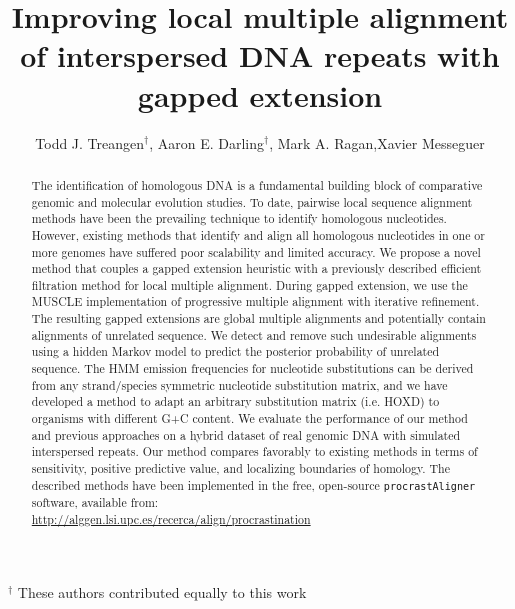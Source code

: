 \documentclass{llncs}
\begin{document}
\title{Improving local multiple alignment of interspersed DNA repeats with gapped extension}

\author{Todd J. Treangen$^\dag$, Aaron E. Darling$^\dag$, Mark A. Ragan,Xavier Messeguer}
%
%

\maketitle
{\center \scriptsize $^\dag$ These authors contributed equally to this work \\}

\begin{abstract}
The identification of homologous DNA is a fundamental building block
of comparative genomic and molecular evolution studies. To date,
pairwise local sequence alignment methods have been the prevailing
technique to identify homologous nucleotides. However, existing
methods that identify and align all homologous nucleotides in one or
more genomes have suffered poor scalability and limited accuracy. We
propose a novel method that couples a gapped extension heuristic with
a previously described efficient filtration method for local multiple
alignment.  During gapped extension, we use the MUSCLE implementation
of progressive multiple alignment with iterative refinement.  The
resulting gapped extensions are global multiple alignments and
potentially contain alignments of unrelated sequence.  We detect and
remove such undesirable alignments using a hidden Markov model to
predict the posterior probability of unrelated sequence. The HMM
emission frequencies for nucleotide substitutions can be derived from
any strand/species symmetric nucleotide substitution matrix, and we
have developed a method to adapt an arbitrary substitution matrix
(i.e. HOXD) to organisms with different G+C content. We evaluate the
performance of our method and previous approaches on a hybrid dataset
of real genomic DNA with simulated interspersed repeats.  Our method
compares favorably to existing methods in terms of sensitivity,
positive predictive value, and localizing boundaries of homology.  The
described methods have been implemented in the free, open-source
\texttt{procrastAligner} software, available from: \\
\url{http://alggen.lsi.upc.es/recerca/align/procrastination}
\end{abstract}
\end{document}
